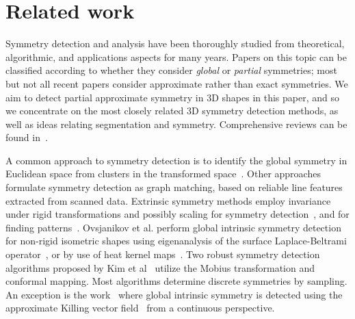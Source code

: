 \section{Related work}
\label{sec:related}

Symmetry detection and analysis have been thoroughly studied from theoretical, algorithmic, and applications aspects for many years. Papers on this topic can  be classified according to whether they consider \emph{global} or \emph{partial} symmetries; most but not all recent papers consider approximate rather than exact symmetries.
We aim to detect partial approximate symmetry in 3D shapes in this paper, and so we concentrate on the most closely related 3D symmetry detection methods, as well as ideas relating segmentation and symmetry. Comprehensive reviews can be found in~\cite{xu2009,berner2011}.

A common approach to symmetry detection is to identify the global symmetry in Euclidean space from clusters in the transformed space~\cite{podolak2006,pauly2008}.
Other approaches~\cite{Berner2008,bokeloh2009} formulate symmetry detection as graph matching, based on  reliable line features extracted from scanned data.
Extrinsic symmetry methods employ invariance under rigid transformations and possibly scaling for symmetry detection~\cite{zabrodsky1997,podolak2006,ovsjanikov2008,ovsjanikov2010,chertok2010,hooda2011},
and for finding patterns~\cite{pauly2008,bokeloh2009,yeh2009}.
Ovsjanikov et al. perform global intrinsic symmetry detection for non-rigid isometric shapes  
using eigenanalysis of the surface Laplace-Beltrami operator~\cite{ovsjanikov2008},
or by use of heat kernel maps~\cite{ovsjanikov2010}.
Two robust symmetry detection algorithms proposed by Kim et al~\cite{kim2010,kim2011} utilize the Mobius transformation and conformal mapping.
Most algorithms determine discrete symmetries by sampling. An exception is the work~\cite{ben-chen2010}
where global intrinsic symmetry is detected using the approximate Killing vector field~\cite{ben-chen2010} from a continuous perspective.

